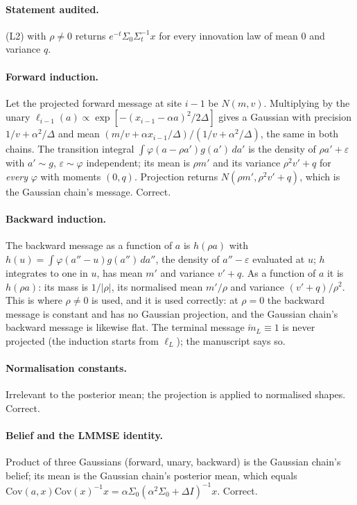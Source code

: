 \documentclass[11pt,a4paper]{article}
\theoremstyle{definition}
\theoremstyle{remark}
\begin{document}
\paragraph{Statement audited.} (L2) with $\rho\ne0$ returns $e^{-t}\Sigma_0\Sigma_t^{-1}x$ for every innovation law of mean $0$ and variance $q$.

\paragraph{Forward induction.} Let the projected forward message at site $i-1$ be $N(m,v)$. Multiplying by the unary $\ell_{i-1}(a)\propto\exp[-(x_{i-1}-\alpha a)^2/2\Delta]$ gives a Gaussian with precision $1/v+\alpha^2/\Delta$ and mean $(m/v+\alpha x_{i-1}/\Delta)/(1/v+\alpha^2/\Delta)$, the same in both chains. The transition integral $\int\varphi(a-\rho a')g(a')\,da'$ is the density of $\rho a'+\varepsilon$ with $a'\sim g$, $\varepsilon\sim\varphi$ independent; its mean is $\rho m'$ and its variance $\rho^2v'+q$ for \emph{every} $\varphi$ with moments $(0,q)$. Projection returns $N(\rho m',\rho^2v'+q)$, which is the Gaussian chain's message. Correct.

\paragraph{Backward induction.} The backward message as a function of $a$ is $h(\rho a)$ with $h(u)=\int\varphi(a''-u)g(a'')\,da''$, the density of $a''-\varepsilon$ evaluated at $u$; $h$ integrates to one in $u$, has mean $m'$ and variance $v'+q$. As a function of $a$ it is $h(\rho a)$: its mass is $1/|\rho|$, its normalised mean $m'/\rho$ and variance $(v'+q)/\rho^2$. This is where $\rho\ne0$ is used, and it is used correctly: at $\rho=0$ the backward message is constant and has no Gaussian projection, and the Gaussian chain's backward message is likewise flat. The terminal message $\overleftarrow m_L\equiv1$ is never projected (the induction starts from $\ell_L$); the manuscript says so.

\paragraph{Normalisation constants.} Irrelevant to the posterior mean; the projection is applied to normalised shapes. Correct.

\paragraph{Belief and the LMMSE identity.} Product of three Gaussians (forward, unary, backward) is the Gaussian chain's belief; its mean is the Gaussian chain's posterior mean, which equals $\mathrm{Cov}(a,x)\mathrm{Cov}(x)^{-1}x=\alpha\Sigma_0(\alpha^2\Sigma_0+\Delta I)^{-1}x$. Correct.
\end{document}
